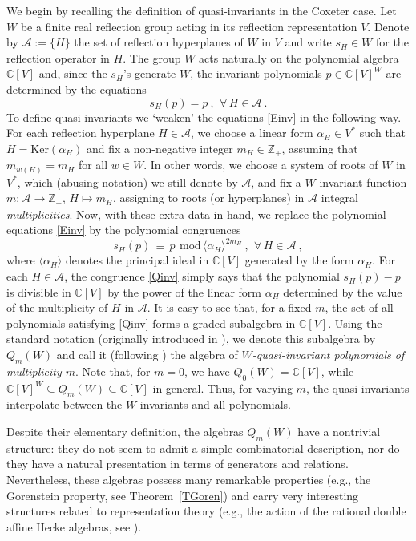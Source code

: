 \documentclass[11pt]{amsart}
\theoremstyle{definition}
\theoremstyle{remark}
\numberwithin{equation}{section}
\newcommand{\la}{\label}
\newcommand{\Ker}{\mathrm{Ker}}
\def\C{\mathbb C}
\def\c{\mathbb{C}}
\def\A{\mathcal{A}}
\def\Z{\mathbb{Z}}
\begin{document}
We begin by recalling the definition of quasi-invariants in the Coxeter case.
Let $ W $ be a finite real reflection group acting in its reflection representation $V$. Denote by 
$ \A := \{H\} $ the set of reflection hyperplanes of $W$ in $V$ and write $ s_H \in W $ for the reflection operator in $H$. The group $W$ acts naturally on the polynomial algebra $ \c[V] $ and, since the $s_{H} $'s generate $W$, the invariant polynomials $p \in \c[V]^W $ are determined by the equations
%
\begin{equation}
\la{Einv}
s_{H}(p) = p \ , \ \, \forall\,H \in \A\ .
\end{equation}
%
To define quasi-invariants we `weaken' the equations \eqref{Einv} in the following way. For each reflection hyperplane $ H \in \A $, we choose a linear form $ \alpha_H \in V^* $ such that
$ H = \Ker(\alpha_H) $ and fix a non-negative integer $ m_{H} \in \Z_{+} $, assuming that $ m_{w(H)} = m_H $ for all $w \in W $.  In other words, we choose a system of roots of $W$ in $V^*$, which (abusing notation) we still denote by $\A$, and fix a $W$-invariant function $m: \A \to \Z_+,\,H \mapsto m_H $, assigning to roots (or hyperplanes) in $\A$ integral {\it multiplicities}. Now, with these extra data in hand, we replace the polynomial equations \eqref{Einv} by the polynomial congruences
%
\begin{equation}
\la{Qinv}
s_{H}(p) \,\equiv\, p \ \,\mbox{mod}\,\langle \alpha_H \rangle^{2 m_H}\ , \ \, \forall\,H \in \A\ ,
\end{equation}
% 
where $ \langle \alpha_H \rangle $ denotes the principal ideal  in $ \c[V] $ generated by the form $ \alpha_H $. For each $H \in \A$, the congruence \eqref{Qinv} simply says that the polynomial $ s_H(p) - p $ is divisible in $\C[V] $ by the power of the linear form $ \alpha_H $ determined by the value of the multiplicity of $H$ in $\A$. It is easy to see that, for a fixed $m$, the set of all polynomials satisfying \eqref{Qinv} forms a graded subalgebra in $ \C[V] $.
Using the standard notation (originally introduced in \cite{FV02}), we denote this subalgebra by $Q_m(W)$ and call it (following \cite{CV90}) the algebra of {\it $W$-quasi-invariant polynomials of multiplicity $m$}. Note that, for $ m = 0 $, we have $ Q_0(W) = \C[V]$, while  $ \C[V]^W \subseteq Q_m(W) \subseteq \C[V] $ in general. Thus, for varying $m$, the quasi-invariants interpolate between the $W$-invariants and all polynomials. 

Despite their elementary definition, the algebras $Q_m(W)$ have a nontrivial structure: they do not seem to admit a simple combinatorial description, nor do they have a natural presentation in terms of generators and relations. Nevertheless, these algebras possess many remarkable properties (e.g., the Gorenstein property, see Theorem~\ref{TGoren}) and carry
very interesting structures related to representation theory (e.g., the action of the rational double affine Hecke algebras, see \cite{BEG03}).
\end{document}
